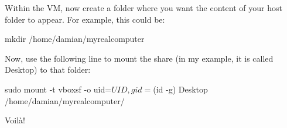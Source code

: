 \documentclass[a4paper,12pt]{book}
\begin{document}
Within the VM, now create a folder where you want the content of your host folder to appear. For example, this could be:

mkdir /home/damian/myrealcomputer

Now, use the following line to mount the share (in my example, it is called Desktop) to that folder:

\begin{lstlistingbash}
sudo mount -t vboxsf -o uid=$UID,gid=$(id -g) Desktop /home/damian/myrealcomputer/
\end{lstlistingbash}

Voil\`a!


\backmatter



\end{document}
